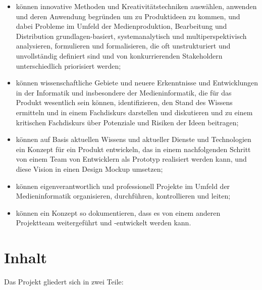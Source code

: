 \begin{itemize}
\tightlist
\item
  können innovative Methoden und Kreativitätstechniken auswählen,
  anwenden und deren Anwendung begründen um zu Produktideen zu kommen,
  und dabei Probleme im Umfeld der Medienproduktion, Bearbeitung und
  Distribution grundlagen-basiert, systemanalytisch und
  multiperspektivisch analysieren, formulieren und formalisieren, die
  oft unstrukturiert und unvollständig definiert sind und von
  konkurrierenden Stakeholdern unterschiedlich priorisiert werden;
\item
  können wissenschaftliche Gebiete und neuere Erkenntnisse und
  Entwicklungen in der Informatik und insbesondere der Medieninformatik,
  die für das Produkt wesentlich sein können, identifizieren, den Stand
  des Wissens ermitteln und in einem Fachdiskurs darstellen und
  diskutieren und zu einem kritischen Fachdiskurs über Potenziale und
  Risiken der Ideen beitragen;
\item
  können auf Basis aktuellen Wissens und aktueller Dienste und
  Technologien ein Konzept für ein Produkt entwickeln, das in einem
  nachfolgenden Schritt von einem Team von Entwicklern als Prototyp
  realisiert werden kann, und diese Vision in einen Design Mockup
  umsetzen;
\item
  können eigenverantwortlich und professionell Projekte im Umfeld der
  Medieninformatik organisieren, durchführen, kontrollieren und leiten;
\item
  können ein Konzept so dokumentieren, dass es von einem anderen
  Projektteam weitergeführt und -entwickelt werden kann.
\end{itemize}

\section*{Inhalt\label{/mi-2017/modulbeschreibungen-master/MA_Modul_Projekt_Vision&Konzept}}\label{inhaltpathlabelmi-2017modulbeschreibungen-mastermaux5fmodulux5fprojektux5fvisionkonzept}

Das Projekt gliedert sich in zwei Teile:

